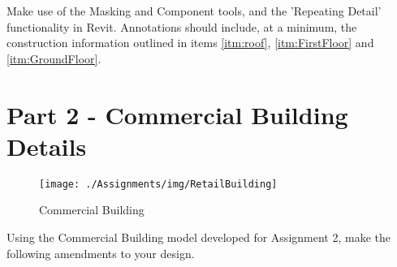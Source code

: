 Make use of the Masking and Component tools, and the 'Repeating Detail' functionality in Revit.  Annotations should include, at a minimum, the construction information outlined in items \ref{itm:roof}, \ref{itm:FirstFloor} and \ref{itm:GroundFloor}. 






\newpage

\section*{Part 2 - Commercial Building Details}

\begin{figure}
	\centering
	\texttt{[image: ./Assignments/img/RetailBuilding]}
	\caption{Commercial Building}
	\label{fig:retailbuilding}
\end{figure}



Using the Commercial Building model developed for Assignment 2, make the following amendments to your design. 


